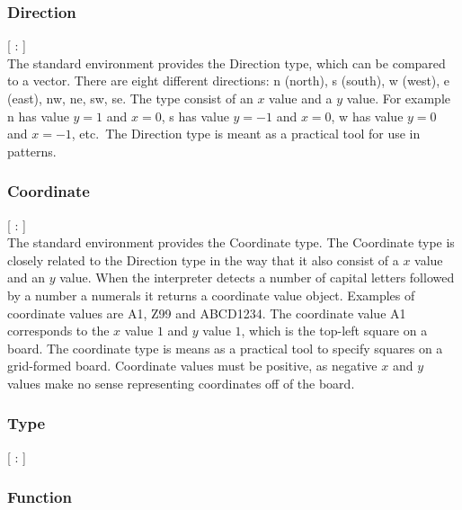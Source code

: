 \subsubsection{Direction}
\begin{dlist}
  \item {}[ : ]\\
  The standard environment provides the Direction type, which can be compared to a vector. There are eight different directions: n (north), s (south), w (west), e (east), nw, ne, sw, se. The type consist of an $x$ value and a $y$ value. For example n has value $y = 1$ and $x = 0$, s has value $y = -1$ and $x = 0$, w has value $y = 0$ and $x = -1$, etc.\ The Direction type is meant as a practical tool for use in patterns. 
\end{dlist}

\subsubsection{Coordinate}
\begin{dlist}
  \item {}[ : ]\\
  The standard environment provides the Coordinate type. The Coordinate type is closely related to the Direction type in the way that it also consist of a $x$ value and an $y$ value. When the interpreter detects a number of capital letters followed by a number a numerals it returns a coordinate value object. Examples of coordinate values are A1, Z99 and ABCD1234. The coordinate value A1 corresponds to the $x$ value $1$ and $y$ value $1$, which is the top-left square on a board. The coordinate type is means as a practical tool to specify squares on a grid-formed board. Coordinate values must be positive, as negative $x$ and $y$ values make no sense representing coordinates off of the board.
\end{dlist}
\subsubsection{Type}
\begin{dlist}
  \item {}[ : ]\\
\end{dlist}
\subsubsection{Function}

